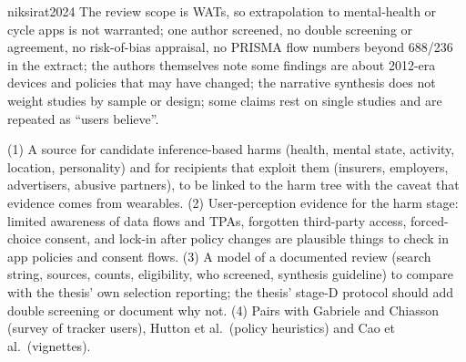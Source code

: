 \begin{papercard}{niksirat2024}
 The review scope is WATs, so extrapolation to mental-health or cycle apps is not warranted; one author screened, no double screening or agreement, no risk-of-bias appraisal, no PRISMA flow numbers beyond 688/236 in the extract; the authors themselves note some findings are about 2012-era devices and policies that may have changed; the narrative synthesis does not weight studies by sample or design; some claims rest on single studies and are repeated as ``users believe''.

 (1) A source for candidate inference-based harms (health, mental state, activity, location, personality) and for recipients that exploit them (insurers, employers, advertisers, abusive partners), to be linked to the harm tree with the caveat that evidence comes from wearables. (2) User-perception evidence for the harm stage: limited awareness of data flows and TPAs, forgotten third-party access, forced-choice consent, and lock-in after policy changes are plausible things to check in app policies and consent flows. (3) A model of a documented review (search string, sources, counts, eligibility, who screened, synthesis guideline) to compare with the thesis' own selection reporting; the thesis' stage-D protocol should add double screening or document why not. (4) Pairs with Gabriele and Chiasson (survey of tracker users), Hutton et al.\ (policy heuristics) and Cao et al.\ (vignettes).
\end{papercard}
